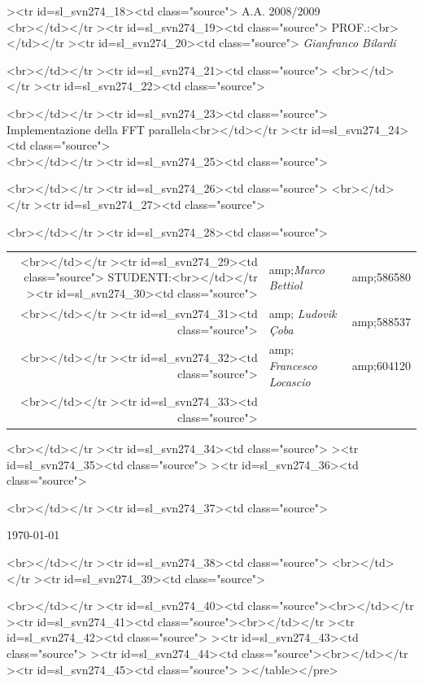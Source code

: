 \begin{titlepage}
\begin{center}
><tr
id=sl_svn274_18><td class="source">      \rm\large\uppercase\expandafter{A.A. 2008/2009\\}<br></td></tr
><tr
id=sl_svn274_19><td class="source">      \rm\large\uppercase\expandafter{Prof.:}<br></td></tr
><tr
id=sl_svn274_20><td class="source">    	\emph{Gianfranco Bilardi}\end{center}<br></td></tr
><tr
id=sl_svn274_21><td class="source">    	<br></td></tr
><tr
id=sl_svn274_22><td class="source">    \vskip1.6cm\begin{center}<br></td></tr
><tr
id=sl_svn274_23><td class="source">    \HRule \\[0.4cm]\LARGE\expandafter{Implementazione della FFT parallela}<br></td></tr
><tr
id=sl_svn274_24><td class="source">    \HRule \\[0.4cm]<br></td></tr
><tr
id=sl_svn274_25><td class="source">    \end{center}<br></td></tr
><tr
id=sl_svn274_26><td class="source">    <br></td></tr
><tr
id=sl_svn274_27><td class="source">    \begin{flushright}\vskip2.0cm <br></td></tr
><tr
id=sl_svn274_28><td class="source">    \begin{tabular}{rll}<br></td></tr
><tr
id=sl_svn274_29><td class="source">	   \rm\large \uppercase{Studenti:}<br></td></tr
><tr
id=sl_svn274_30><td class="source">	   &amp;\emph{Marco Bettiol} &amp;586580\\<br></td></tr
><tr
id=sl_svn274_31><td class="source">	   &amp; \emph{Ludovik \c{C}oba} &amp;588537\\<br></td></tr
><tr
id=sl_svn274_32><td class="source">	   &amp; \emph{Francesco Locascio} &amp;604120\\<br></td></tr
><tr
id=sl_svn274_33><td class="source">		\end{tabular}<br></td></tr
><tr
id=sl_svn274_34><td class="source">%
><tr
id=sl_svn274_35><td class="source">%
><tr
id=sl_svn274_36><td class="source">		\end{flushright}<br></td></tr
><tr
id=sl_svn274_37><td class="source">    \vfill\begin{center}\today \end{center}<br></td></tr
><tr
id=sl_svn274_38><td class="source">    <br></td></tr
><tr
id=sl_svn274_39><td class="source">\end{titlepage}<br></td></tr
><tr
id=sl_svn274_40><td class="source"><br></td></tr
><tr
id=sl_svn274_41><td class="source">\newpage<br></td></tr
><tr
id=sl_svn274_42><td class="source">%
><tr
id=sl_svn274_43><td class="source">%
><tr
id=sl_svn274_44><td class="source"><br></td></tr
><tr
id=sl_svn274_45><td class="source">%
></table></pre>

